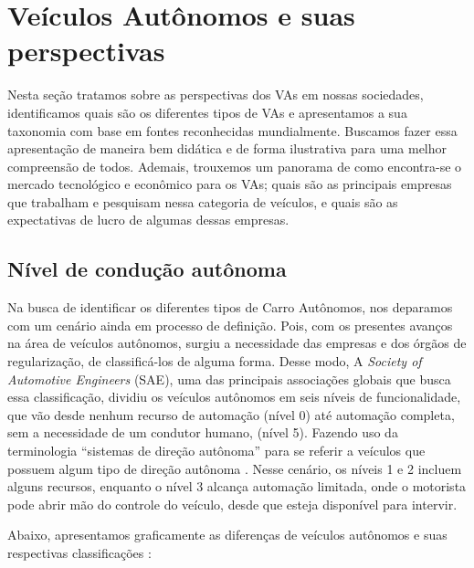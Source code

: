 \section{Veículos Autônomos e suas perspectivas}

Nesta seção tratamos sobre as perspectivas dos VAs em nossas sociedades, identificamos quais são os diferentes tipos de VAs e apresentamos a sua taxonomia com base em fontes reconhecidas mundialmente. Buscamos fazer essa apresentação de maneira bem didática e de forma ilustrativa para uma melhor compreensão de todos. Ademais, trouxemos um panorama de como encontra-se o mercado tecnológico e econômico para os VAs; quais são as principais empresas que trabalham e pesquisam nessa categoria de veículos, e quais são as expectativas de lucro de algumas dessas empresas.

\subsection{Nível de condução autônoma}
	
Na busca de identificar os diferentes tipos de Carro Autônomos, nos deparamos com um cenário ainda em processo de definição. Pois, com os presentes avanços na área de veículos autônomos, surgiu a necessidade das empresas e dos órgãos de regularização, de classificá-los de alguma forma. Desse modo, A \textit{Society of Automotive Engineers} (SAE), uma das principais associações globais que busca essa classificação, dividiu os veículos autônomos em seis níveis de funcionalidade, que vão desde nenhum recurso de automação (nível 0) até automação completa, sem a necessidade de um condutor humano, (nível 5). Fazendo uso da terminologia “sistemas de direção autônoma” para se referir a veículos que possuem algum tipo de direção autônoma \cite{SAE}. Nesse cenário, os níveis 1 e 2 incluem alguns recursos, enquanto o nível 3 alcança automação limitada, onde o motorista pode abrir mão do controle do veículo, desde que esteja disponível para intervir.

Abaixo, apresentamos graficamente as diferenças de veículos autônomos e suas respectivas classificações \cite{SAE}:

